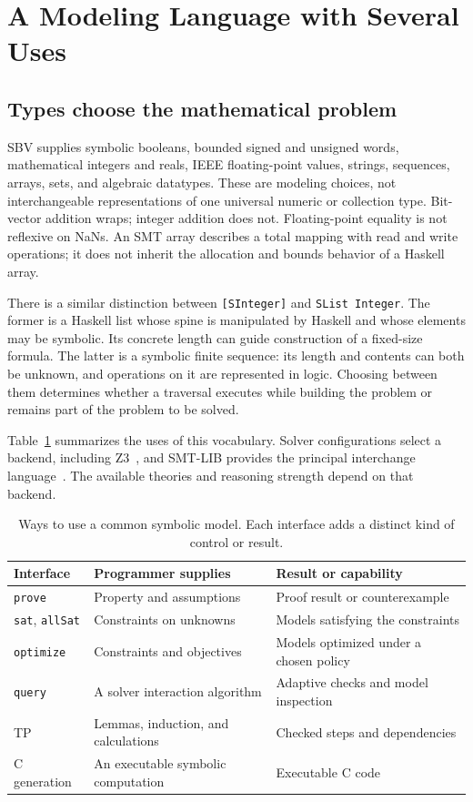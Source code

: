 \documentclass[acmsmall,screen,nonacm]{acmart}
\newcommand{\code}[1]{\texttt{#1}}
\begin{document}
\section{A Modeling Language with Several Uses}
\label{sec:example}

\subsection{Types choose the mathematical problem}

SBV supplies symbolic booleans, bounded signed and unsigned words, mathematical
integers and reals, IEEE floating-point values, strings, sequences, arrays,
sets, and algebraic datatypes. These are modeling choices, not interchangeable
representations of one universal numeric or collection type. Bit-vector
addition wraps; integer addition does not. Floating-point equality is not
reflexive on NaNs. An SMT array describes a total mapping with read and write
operations; it does not inherit the allocation and bounds behavior of a
Haskell array.

There is a similar distinction between \code{[SInteger]} and
\code{SList Integer}. The former is a Haskell list whose spine is manipulated
by Haskell and whose elements may be symbolic. Its concrete length can guide
construction of a fixed-size formula. The latter is a symbolic finite sequence:
its length and contents can both be unknown, and operations on it are represented
in logic. Choosing between them determines whether a traversal executes while
building the problem or remains part of the problem to be solved.

Table~\ref{tab:capabilities} summarizes the uses of this vocabulary. Solver
configurations select a backend, including Z3~\citep{z3}, and SMT-LIB provides
the principal interchange language~\citep{smtlib}. The available theories and
reasoning strength depend on that backend.

\begin{table}[t]
\caption{Ways to use a common symbolic model. Each interface adds a distinct
kind of control or result.}
\label{tab:capabilities}
\begin{tabularx}{\linewidth}{@{}l X X@{}}
\toprule
Interface & Programmer supplies & Result or capability\\
\midrule
\code{prove} & Property and assumptions & Proof result or counterexample\\
\code{sat}, \code{allSat} & Constraints on unknowns & Models satisfying the constraints\\
\code{optimize} & Constraints and objectives & Models optimized under a chosen policy\\
\code{query} & A solver interaction algorithm & Adaptive checks and model inspection\\
TP & Lemmas, induction, and calculations & Checked steps and dependencies\\
C generation & An executable symbolic computation & Executable C code\\
\bottomrule
\end{tabularx}
\end{table}
\end{document}
